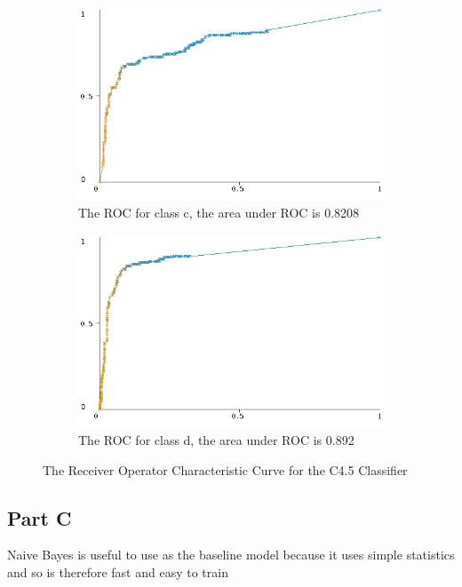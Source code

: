 \documentclass[10pt]{article}
\begin{document}
\begin{figure}[ht]
\begin{subfigure}[b]{0.475\textwidth}
        \includegraphics[width=\textwidth]{c45_roc/roc_curve_c.jpg}
        \caption[]%
        {{\small The ROC for class c, the area under ROC is 0.8208}}    
        \label{fig:c45 roc curve class c}
    \end{subfigure}
    \quad
    \begin{subfigure}[b]{0.475\textwidth}   
        \centering 
        \includegraphics[width=\textwidth]{c45_roc/roc_curve_e(d).jpg}
        \caption[]%
        {{\small The ROC for class d, the area under ROC is 0.892}}    
        \label{fig:c45 roc curve class d}
    \end{subfigure}
    \caption[ ]
    {\small The Receiver Operator Characteristic Curve for the C4.5 Classifier} 
    \label{fig:c45 roc curves}
\end{figure}



\subsection*{Part C}
Naive Bayes is useful to use as the baseline model because it uses simple statistics and so is therefore fast and easy to train 
\end{document}
